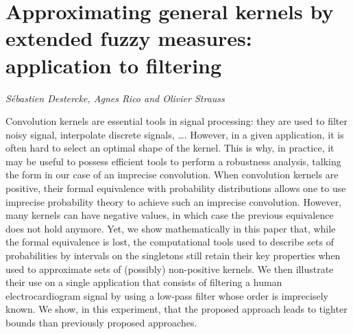 \documentclass[../booklet.tex]{subfiles}
\begin{document}
\section[Approximating general kernels by extended fuzzy measures: application to filtering. {\it Sébastien Destercke, Agnes Rico and Olivier Strauss}]{Approximating general kernels by extended fuzzy measures: application to filtering}
  

\begin{center}
  {\it Sébastien Destercke, Agnes Rico and Olivier Strauss}
\end{center}

\vskip 0.8cm


Convolution kernels are essential tools in signal processing: they are used to filter noisy signal, interpolate discrete signals, \ldots. However, in a given application, it is often hard to select an optimal shape of the kernel. This is why, in practice, it may be useful to possess efficient tools to perform a robustness analysis, talking the form in our case of an imprecise convolution. When convolution kernels are positive, their formal equivalence with probability distributions allows one to use imprecise probability theory to achieve such an imprecise convolution. However, many kernels can have negative values, in which case the previous equivalence does not hold anymore. Yet, we show mathematically in this paper that, while the formal equivalence is lost, the computational tools used to describe sets of probabilities by intervals on the singletons still retain their key properties when used to approximate sets of (possibly) non-positive kernels. We then illustrate their use on a single application that consists of filtering a human electrocardiogram signal by using a low-pass filter whose order is imprecisely known. We show, in this experiment, that the proposed approach leads to tighter bounds than previously proposed approaches.
\end{document}
